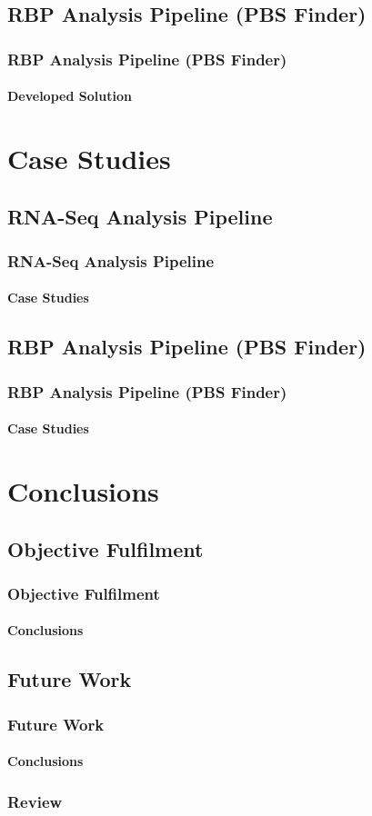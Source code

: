 \documentclass{beamer}
\begin{document}
\subsection{RBP Analysis Pipeline (PBS Finder)}
\begin{frame}
  \frametitle{RBP Analysis Pipeline (PBS Finder)}
  \framesubtitle{Developed Solution}
\end{frame}


\section{Case Studies}
\subsection{RNA-Seq Analysis Pipeline}
\begin{frame}
  \frametitle{RNA-Seq Analysis Pipeline}
  \framesubtitle{Case Studies}
\end{frame}

\subsection{RBP Analysis Pipeline (PBS Finder)}
\begin{frame}
  \frametitle{RBP Analysis Pipeline (PBS Finder)}
  \framesubtitle{Case Studies}
\end{frame}


\section{Conclusions}
\subsection{Objective Fulfilment}
\begin{frame}
  \frametitle{Objective Fulfilment}
  \framesubtitle{Conclusions}
\end{frame}

\subsection{Future Work}
\begin{frame}
  \frametitle{Future Work}
  \framesubtitle{Conclusions}
\end{frame}


\begin{frame}
  \frametitle{Review}
  \tableofcontents
\end{frame}

\frame{\titlepage}
\end{document}
